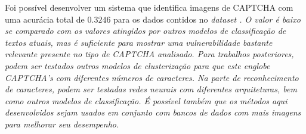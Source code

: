\documentclass[11pt]{article}
\begin{document}
Foi possível desenvolver um sistema que identifica imagens de CAPTCHA com uma acurácia total de $0.3246$ para os dados contidos no \em dataset \em \cite{data}. O valor é baixo se comparado com os valores atingidos por outros modelos de classificação de textos atuais, mas é suficiente para mostrar uma vulnerabilidade bastante relevante presente no tipo de CAPTCHA analisado. Para trabalhos posteriores, podem ser testados outros modelos de clusterização para que este englobe CAPTCHA’s com diferentes números de caracteres. Na parte de reconhecimento de caracteres, podem ser testadas redes neurais com diferentes arquiteturas, bem como outros modelos de classificação. É possível também que os métodos aqui desenvolvidos sejam usados em conjunto com bancos de dados com mais imagens para melhorar seu desempenho.

\nocite{15min} 
  

   
\end{document}
